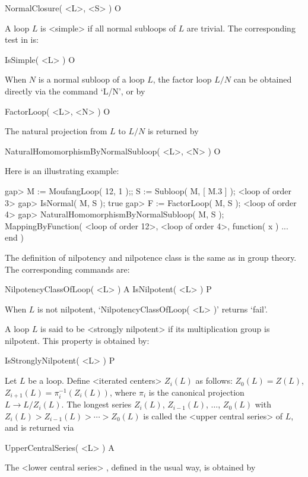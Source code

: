 \>NormalClosure( <L>, <S> ) O

A loop $L$ is <simple> if all normal subloops of $L$ are
trivial. The corresponding test in {\LOOPS} is:

\>IsSimple( <L> ) O


When $N$ is a normal subloop of a loop $L$, the factor loop $L/N$ can be
obtained directly via the command `L/N', or by

\>FactorLoop( <L>, <N> ) O

The natural projection from $L$ to $L/N$ is returned by

\>NaturalHomomorphismByNormalSubloop( <L>, <N> ) O

Here is an illustrating example:

\beginexample
gap> M := MoufangLoop( 12, 1 );; S := Subloop( M, [ M.3 ] );
<loop of order 3>
gap> IsNormal( M, S );
true
gap> F := FactorLoop( M, S );
<loop of order 4>
gap> NaturalHomomorphismByNormalSubloop( M, S );
MappingByFunction( <loop of order 12>, <loop of order 4>,
    function( x ) ... end )
\endexample


The definition of nilpotency and nilpotence class is the same as in group
theory. The corresponding commands are:

\>NilpotencyClassOfLoop( <L> ) A
\>IsNilpotent( <L> ) P

When $L$ is not nilpotent, `NilpotencyClassOfLoop( <L> )' returns `fail'.

A loop $L$ is said to be <strongly nilpotent> if its multiplication group is nilpotent. This property is obtained by:

\>IsStronglyNilpotent( <L> ) P

Let $L$ be a loop. Define <iterated centers>
%
%
 $Z_i(L)$ as
follows: $Z_0(L)=Z(L)$, $Z_{i+1}(L) = \pi_i^{-1}( Z_i(L) )$, where $\pi_i$ is
the canonical projection $L\to L/Z_i(L)$. The longest series $Z_i(L)$,
$Z_{i-1}(L)$, $\dots$, $Z_0(L)$ with $Z_i(L)>Z_{i-1}(L)>\cdots >Z_0(L)$ is
called the <upper central series>
%
%
 of $L$, and is returned via

\>UpperCentralSeries( <L> ) A

The <lower central series>
%
%
, defined in the usual way, is obtained by

